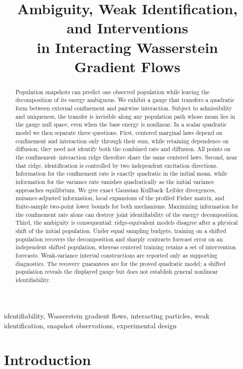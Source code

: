 \documentclass[anon,11pt]{alt2027}
\title[Ambiguity in Interacting Gradient Flows]{%
Ambiguity, Weak Identification, and Interventions\\
in Interacting Wasserstein Gradient Flows}
\begin{document}
\maketitle

\begin{abstract}
Population snapshots can predict one observed population while leaving the
decomposition of its energy ambiguous. We exhibit a gauge that transfers a
quadratic form between external confinement and pairwise interaction. Subject
to admissibility and uniqueness, the transfer is invisible along any
population path whose mean lies in the gauge null space, even when the base
energy is nonlinear. In a scalar quadratic model we then separate three
questions. First, centered marginal laws depend on confinement and interaction
only through their sum, while retaining dependence on diffusion; they need not
identify both the combined rate and diffusion. All points on the
confinement--interaction ridge therefore share the same centered laws. Second,
near that ridge, identification is controlled by two independent
excitation directions. Information for the confinement rate is exactly
quadratic in the initial mean, while information for the variance rate
vanishes quadratically as the initial variance approaches equilibrium.
We give exact Gaussian Kullback--Leibler divergences, nuisance-adjusted
information, local expansions of the profiled Fisher matrix, and
finite-sample two-point lower bounds for both mechanisms. Maximizing
information for the confinement rate alone can destroy joint identifiability
of the energy decomposition.
Third, the ambiguity is consequential: ridge-equivalent models disagree after
a physical shift of the initial population. Under equal sampling budgets,
training on a shifted population recovers the decomposition and sharply
contracts forecast error on an independent shifted population, whereas
centered training retains a set of intervention forecasts. Weak-variance
interval constructions are reported only as supporting diagnostics.
The recovery
guarantees are for the proved quadratic model; a shifted population reveals
the displayed gauge but does not establish general nonlinear identifiability.
\end{abstract}

\begin{keywords}
identifiability, Wasserstein gradient flows, interacting particles,
weak identification, snapshot observations, experimental design
\end{keywords}

\section{Introduction}
\end{document}
